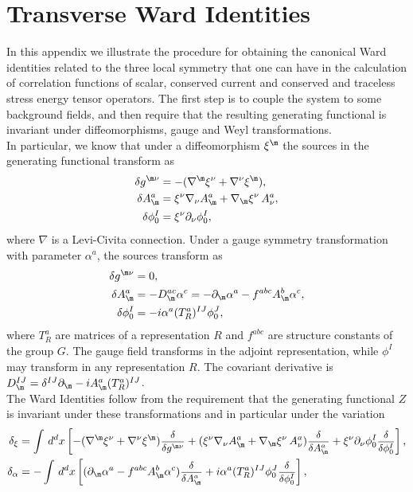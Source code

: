 \documentclass[a4paper,11pt,openright,twoside]{book}
\let\a=\alpha   \let\b=\beta   \let\g=\gamma   \let\d=\delta
\let\n=\nu      \let\x=\xi     \let\p=\pi      \let\r=\rho
\newcommand{\sdfrac}[2]{\mbox{\small$\displaystyle\frac{#1}{#2}$}}
\numberwithin{equation}{section}
\begin{document}
{{\chapter{Transverse Ward Identities}\label{transWard}
In this appendix we illustrate the procedure for obtaining the canonical Ward identities related to the three local symmetry that one can have in the calculation of correlation functions of scalar, conserved current and conserved and traceless stress energy tensor operators. The first step is to couple the system to some background fields, and then require that the resulting generating functional is invariant  under {diffeomorphisms}, {gauge} and {Weyl} transformations. \\
In particular, we know that under a diffeomorphism $\x^\m$ the sources in the generating functional transform as
\begin{align}
	\d g^{\m\n}&=-(\nabla^\m\x^\n+\nabla^\n\x^\m),\\
	\d A^a_\m&=\x^\n\nabla_\n A_\m^a+\nabla_\m\x^\n\,A_\n^a,\\
	\d\phi_0^I&=\x^\n\partial_\n\phi_0^I,
\end{align}
where $\nabla$ is a Levi-Civita connection. Under a gauge symmetry transformation with parameter $\a^a$, the sources transform as
\begin{align}
	\d g^{\m\n}&=0,\\
	\d A^a_\m&=-D_\m^{ac}\a^c=-\partial_\m\a^a-f^{abc}A_\m^b\a^c,\\
	\d\phi_0^I&=-i\a^a(T^a_R)^{IJ}\phi^J_0,
\end{align}
where $T^a_R$ are matrices of a representation $R$ and $f^{abc}$ are structure constants of the group $G$. The gauge field transforms in the adjoint representation, while $\phi^I$ may transform in any representation $R$. The covariant derivative is $D_\m^{IJ}=\d^{IJ}\partial_\m-iA_\m^a(T_R^a)^{IJ}$.\\
The Ward Identities follow from the requirement that the generating functional $Z$ is invariant under these transformations and in particular under the variation
\begin{align}
	\d_\x&=\int\,d^dx\left[-(\nabla^\m\x^\n+\nabla^\n\x^\m)\sdfrac{\d}{\d g^{\m\n}}+(\x^\n\nabla_\n A_\m^a+\nabla_\m\x^\n\,A_\n^a)\sdfrac{\d}{\d A_\m^a}+\x^\n\partial_\n\phi_0^I\sdfrac{\d}{\d\phi_0^I}\right],\\
	\d_\a&=-\int\,d^dx\left[(\partial_\m\a^a-f^{abc}A_\m^b\a^c)\sdfrac{\d}{\d A_\m^a}+i\a^a(T^a_R)^{IJ}\phi^J_0\sdfrac{\d}{\d\phi_0^I}\right],
\end{align}
}}
\end{document}
